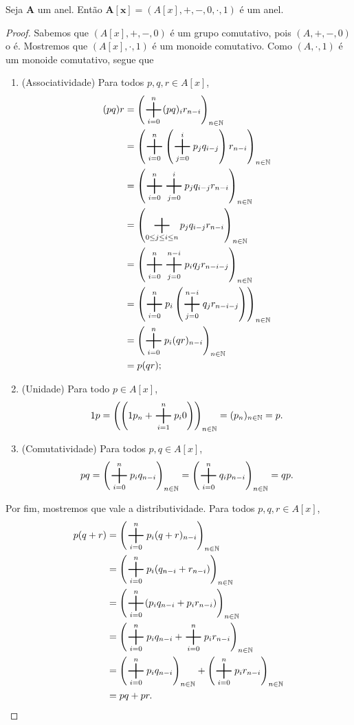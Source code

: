 \begin{prop}
Seja $\bm A$ um anel. Então $\bm{A[x]} = (A[x],+,-,0,\cdot,1)$ é um anel.
\end{prop}
\begin{proof}
Sabemos que $(A[x],+,-,0)$ é um grupo comutativo, pois $(A,+,-,0)$ o é. Mostremos que $(A[x],\cdot,1)$ é um monoide comutativo. Como $(A,\cdot,1)$ é um monoide comutativo, segue que
	\begin{enumerate}
	\item (Associatividade) Para todos $p,q,r \in A[x]$,
		\begin{align*}
		(pq)r &= \left(\sum_{i=0}^n (pq)_i r_{n-i}\right)_{n \in \N} \\
			&= \left(\sum_{i=0}^n \left(\sum_{j=0}^i p_j q_{i-j}\right) r_{n-i}\right)_{n \in \N} \\
			&= \left(\sum_{i=0}^n \sum_{j=0}^i p_j q_{i-j} r_{n-i} \right)_{n \in \N} \\
			&= \left(\sum_{0 \leq j \leq i \leq n} p_j q_{i-j} r_{n-i} \right)_{n \in \N} \\
			&= \left(\sum_{i=0}^n \sum_{j=0}^{n-i} p_i q_j r_{n-i-j} \right)_{n \in \N}\\
			&= \left(\sum_{i=0}^n p_i \left(\sum_{j=0}^{n-i} q_j r_{n-i-j}\right)\right)_{n \in \N}\\
			&= \left(\sum_{i=0}^n p_i (qr)_{n-i}\right)_{n \in \N}\\
			&= p(qr);
		\end{align*}
	\item (Unidade) Para todo $p \in A[x]$,
		\begin{equation*}
		1p = \left(\left(1p_n + \sum_{i=1}^{n} p_i 0 \right)\right)_{n \in \N} = (p_n)_{n \in \N} = p.
		\end{equation*}
	\item (Comutatividade) Para todos $p,q \in A[x]$,
		\begin{equation*}
		pq = \left(\sum_{i=0}^n p_i q_{n-i}\right)_{n \in \N} = \left(\sum_{i=0}^n q_i p_{n-i}\right)_{n \in \N} = qp.
		\end{equation*}
	\end{enumerate}
Por fim, mostremos que vale a distributividade. Para todos $p,q,r \in A[x]$,
	\begin{align*}
	p (q + r) &= \left(\sum_{i=0}^n p_i (q+r)_{n-i}\right)_{n \in \N} \\
		&=  \left(\sum_{i=0}^n p_i (q_{n-i}+r_{n-i})\right)_{n \in \N} \\
		&=  \left(\sum_{i=0}^n (p_i q_{n-i} + p_i r_{n-i})\right)_{n \in \N} \\
		&=  \left(\sum_{i=0}^n p_i q_{n-i} + \sum_{i=0}^n p_i r_{n-i}\right)_{n \in \N} \\
		&= \left(\sum_{i=0}^n p_i q_{n-i}\right)_{n \in \N} + \left(\sum_{i=0}^n p_i r_{n-i}\right)_{n \in \N} \\
		&= pq+pr.
	\end{align*}	
\end{proof}

